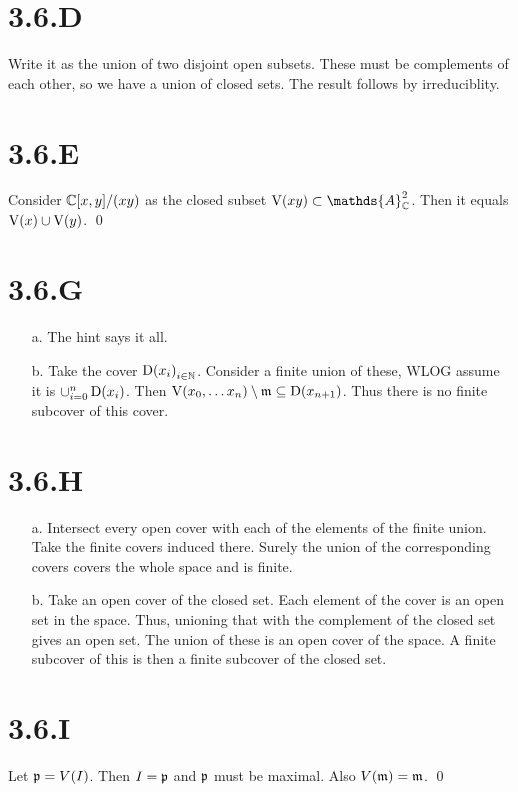 \documentclass{article}
\begin{document}
\section{3.6.D}
Write it as the union of two disjoint open subsets. These must be complements
of each other, so we have a union of closed sets. The result follows by
irreduciblity.

\section{3.6.E}
Consider $\mathbb{C}[x,y]/(xy)$ as the closed subset $\V(xy) \subset \mathds{A}^2_{\C}$.
Then it equals $\operatorname{V}(x) \cup \operatorname{V}(y)$. \qed

\section{3.6.G}
\begin{itemize}
    \item[a.] The hint says it all.
    \item[b.] Take the cover ${\operatorname{D}(x_i)}_{i \in \mathbb{N}}$. Consider a finite union of these,
          WLOG assume it is $\cup_{i=0}^n \operatorname{D}(x_i)$. Then $\operatorname{V}(x_0, \dots x_n) \setminus \mathfrak{m} \subseteq \operatorname{D}(x_{n+1})$. Thus there
          is no finite subcover of this cover.
\end{itemize}

\section{3.6.H}
\begin{itemize}
    \item [a.] Intersect every open cover with each of the elements of the finite union.
          Take the finite covers induced there. Surely the union of the corresponding
          covers covers the whole space and is finite.
    \item [b.] Take an open cover of the closed set. Each element of the cover is an open
          set in the space. Thus, unioning that with the complement of the closed set
          gives an open set. The union of these is an open cover of the space. A finite
          subcover of this is then a finite subcover of the closed set.
\end{itemize}

\section{3.6.I}
Let ${\mathfrak{p}}=V(I)$. Then $I=\mathfrak{p}$ and
$\mathfrak{p}$ must be maximal. Also $V(\mathfrak{m})={\mathfrak{m}}$. \qed
\end{document}
